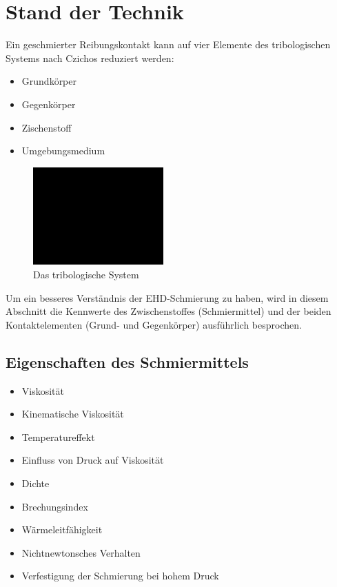 \chapter{Stand der Technik}
\label{chap:stand_der_technik}

Ein geschmierter Reibungskontakt kann auf vier Elemente des tribologischen Systems nach Czichos \cite{czihos} reduziert werden:
\begin{itemize}
    \item Grundkörper
    \item Gegenkörper
    \item Zischenstoff
    \item Umgebungsmedium
\end{itemize}

\begin{figure}[htb]
    \centering
    \includegraphics[width=5cm]{./images/blank_img.jpg}
    \caption{Das tribologische System}
    \label{fig:das_tribologische_system}
\end{figure}

Um ein besseres Verständnis der EHD-Schmierung zu haben, wird in diesem Abschnitt die Kennwerte des Zwischenstoffes (Schmiermittel) und der beiden Kontaktelementen (Grund- und Gegenkörper) ausführlich besprochen.

\section{Eigenschaften des Schmiermittels}
\label{sec:eigenschaften_des_schmiermittels}
\begin{itemize}
    \item Viskosität
    \item Kinematische Viskosität
    \item Temperatureffekt
    \item Einfluss von Druck auf Viskosität
    \item Dichte
    \item Brechungsindex
    \item Wärmeleitfähigkeit
    \item Nichtnewtonsches Verhalten
    \item Verfestigung der Schmierung bei hohem Druck
\end{itemize}

